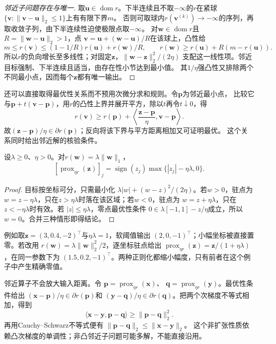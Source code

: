 \begin{proof}[邻近子问题存在与唯一]
取$\bm u\in\operatorname{dom}r$。下半连续且不取$-\infty$的$r$在紧球
$\{\bm v:\|\bm v-\bm u\|_2\leq1\}$上有有限下界$m$。
否则可取球内$r(\bm v^{(k)})\to-\infty$的序列，再取收敛子列，由下半连续性迫使极限点取$-\infty$。
对$\bm w\in\operatorname{dom}r$且$R=\|\bm w-\bm u\|_2>1$，点
$\bm v=\bm u+(\bm w-\bm u)/R$在该球上，凸性给
\[
 m\leq r(\bm v)\leq(1-1/R)r(\bm u)+r(\bm w)/R,
 \qquad
 r(\bm w)\geq r(\bm u)+R(m-r(\bm u)).
\]
所以$r$的负向增长至多线性；对固定$\bm z$，$\|\bm w-\bm z\|_2^2/(2\eta)$
支配这一线性项。邻近目标强制、下半连续且适当，由存在性小节达到最小值。
其$1/\eta$强凸性又排除两个不同最小点，因而每个$\bm z$都有唯一输出。
\end{proof}

还可以直接取得最优性关系而不预用次微分求和规则。令$\bm p$为邻近最小点，
比较它与$\bm p+t(\bm v-\bm p)$，用$r$的凸性上界并展开平方，除以$t$再令$t\downarrow0$，得
\[
 r(\bm v)\geq r(\bm p)+
 \left\langle\frac{\bm z-\bm p}{\eta},\bm v-\bm p\right\rangle.
\]
故$(\bm z-\bm p)/\eta\in\partial r(\bm p)$；反向将该下界与平方距离相加又可证明最优。
这个关系同时给出邻近解的核验条件。

\begin{theorem}
\label{thm:opt-soft-threshold}
设$\lambda\geq0$、$\eta>0$。对$r(\bm{w})=\lambda\lVert\bm{w}\rVert_1$，
\[
  [\operatorname{prox}_{\eta r}(\bm{z})]_j
  =\operatorname{sign}(z_j)\max\{|z_j|-\eta\lambda,0\}.
\]
\end{theorem}

\begin{proof}
目标按坐标可分，只需最小化
$\lambda|w|+(w-z)^2/(2\eta)$。若$w>0$，驻点为
$w=z-\eta\lambda$，只在$z>\eta\lambda$时落在该区域；若$w<0$，驻点为
$w=z+\eta\lambda$，只在$z<-\eta\lambda$时有效。若
$|z|\leq\eta\lambda$，零点最优性条件
$0\in\lambda[-1,1]-z/\eta$成立，所以$w=0$。合并三种情形即得结论。
\end{proof}

例如取$\bm z=(3,0.4,-2)^{\top}$与$\eta\lambda=1$，软阈值输出
$(2,0,-1)^{\top}$；小幅坐标被直接置零。若改用
$r(\bm w)=\lambda\lVert\bm w\rVert_2^2/2$，逐坐标驻点给出
$\operatorname{prox}_{\eta r}(\bm z)=\bm z/(1+\eta\lambda)$，在同一参数下为
$(1.5,0.2,-1)^{\top}$。两种正则化都缩小幅度，只有前者在这个例子中产生精确零值。

邻近算子不会放大输入距离。令
$\bm{p}=\operatorname{prox}_{\eta r}(\bm{x})$、
$\bm{q}=\operatorname{prox}_{\eta r}(\bm{y})$。最优性条件给出
$(\bm{x}-\bm{p})/\eta\in\partial r(\bm{p})$和
$(\bm{y}-\bm{q})/\eta\in\partial r(\bm{q})$。把两个次梯度不等式相加，得到
\[
  \langle\bm{x}-\bm{y},\bm{p}-\bm{q}\rangle
  \geq\lVert\bm{p}-\bm{q}\rVert_2^2.
\]
再用Cauchy--Schwarz不等式便有
$\lVert\bm{p}-\bm{q}\rVert_2\leq\lVert\bm{x}-\bm{y}\rVert_2$。
这个非扩张性质依赖凸次梯度的单调性；非凸邻近子问题可能多解，不能直接沿用。

